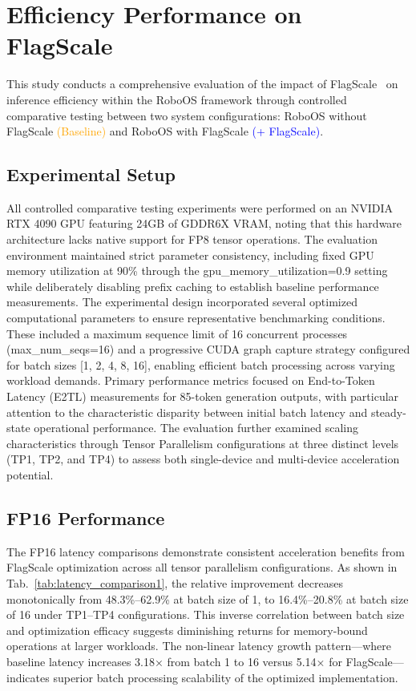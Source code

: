\section{Efficiency Performance on FlagScale}
\label{sec3}
This study conducts a comprehensive evaluation of the impact of FlagScale~\cite{FlagScale2024} on inference efficiency within the RoboOS framework through controlled comparative testing between two system configurations: RoboOS without FlagScale \textcolor{orange}{(Baseline)} and RoboOS with FlagScale  \textcolor{blue}{(+ FlagScale)}.

\subsection{Experimental Setup}
 All controlled comparative testing experiments were performed on an NVIDIA RTX 4090 GPU featuring 24GB of GDDR6X VRAM, noting that this hardware architecture lacks native support for FP8 tensor operations. The evaluation environment maintained strict parameter consistency, including fixed GPU memory utilization at 90\% through the gpu\_memory\_utilization=0.9 setting while deliberately disabling prefix caching to establish baseline performance measurements.
The experimental design incorporated several optimized computational parameters to ensure representative benchmarking conditions. These included a maximum sequence limit of 16 concurrent processes (max\_num\_seqs=16) and a progressive CUDA graph capture strategy configured for batch sizes [1, 2, 4, 8, 16], enabling efficient batch processing across varying workload demands. Primary performance metrics focused on End-to-Token Latency (E2TL) measurements for 85-token generation outputs, with particular attention to the characteristic disparity between initial batch latency and steady-state operational performance. The evaluation further examined scaling characteristics through Tensor Parallelism configurations at three distinct levels (TP1, TP2, and TP4) to assess both single-device and multi-device acceleration potential.



\subsection{FP16 Performance}
The FP16 latency comparisons demonstrate consistent acceleration benefits from FlagScale optimization across all tensor parallelism configurations. As shown in Tab.~\ref{tab:latency_comparison1}, the relative improvement decreases monotonically from 48.3\%–62.9\% at batch size of 1, to 16.4\%–20.8\% at batch size of 16 under TP1–TP4 configurations. This inverse correlation between batch size and optimization efficacy suggests diminishing returns for memory-bound operations at larger workloads. The non-linear latency growth pattern—where baseline latency increases 3.18× from batch 1 to 16 versus 5.14× for FlagScale—indicates superior batch processing scalability of the optimized implementation.

